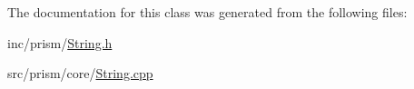 The documentation for this class was generated from the following files\+:\begin{DoxyCompactItemize}
\item 
inc/prism/\hyperlink{_string_8h}{String.\+h}\item 
src/prism/core/\hyperlink{_string_8cpp}{String.\+cpp}\end{DoxyCompactItemize}
